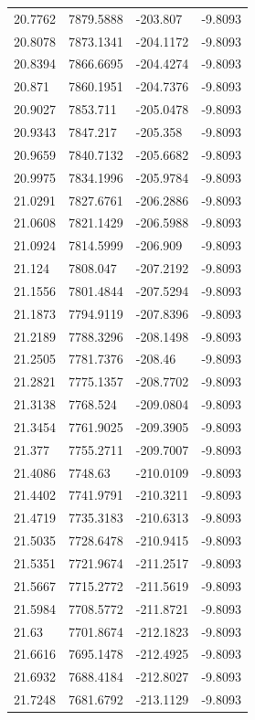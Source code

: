 \begin{table}[H]
\begin{tabular}{llll}
20.7762 & 7879.5888 & -203.807 & -9.8093 \\
20.8078 & 7873.1341 & -204.1172 & -9.8093 \\
20.8394 & 7866.6695 & -204.4274 & -9.8093 \\
20.871 & 7860.1951 & -204.7376 & -9.8093 \\
20.9027 & 7853.711 & -205.0478 & -9.8093 \\
20.9343 & 7847.217 & -205.358 & -9.8093 \\
20.9659 & 7840.7132 & -205.6682 & -9.8093 \\
20.9975 & 7834.1996 & -205.9784 & -9.8093 \\
21.0291 & 7827.6761 & -206.2886 & -9.8093 \\
21.0608 & 7821.1429 & -206.5988 & -9.8093 \\
21.0924 & 7814.5999 & -206.909 & -9.8093 \\
21.124 & 7808.047 & -207.2192 & -9.8093 \\
21.1556 & 7801.4844 & -207.5294 & -9.8093 \\
21.1873 & 7794.9119 & -207.8396 & -9.8093 \\
21.2189 & 7788.3296 & -208.1498 & -9.8093 \\
21.2505 & 7781.7376 & -208.46 & -9.8093 \\
21.2821 & 7775.1357 & -208.7702 & -9.8093 \\
21.3138 & 7768.524 & -209.0804 & -9.8093 \\
21.3454 & 7761.9025 & -209.3905 & -9.8093 \\
21.377 & 7755.2711 & -209.7007 & -9.8093 \\
21.4086 & 7748.63 & -210.0109 & -9.8093 \\
21.4402 & 7741.9791 & -210.3211 & -9.8093 \\
21.4719 & 7735.3183 & -210.6313 & -9.8093 \\
21.5035 & 7728.6478 & -210.9415 & -9.8093 \\
21.5351 & 7721.9674 & -211.2517 & -9.8093 \\
21.5667 & 7715.2772 & -211.5619 & -9.8093 \\
21.5984 & 7708.5772 & -211.8721 & -9.8093 \\
21.63 & 7701.8674 & -212.1823 & -9.8093 \\
21.6616 & 7695.1478 & -212.4925 & -9.8093 \\
21.6932 & 7688.4184 & -212.8027 & -9.8093 \\
21.7248 & 7681.6792 & -213.1129 & -9.8093 \\

\end{tabular}
\end{table}
